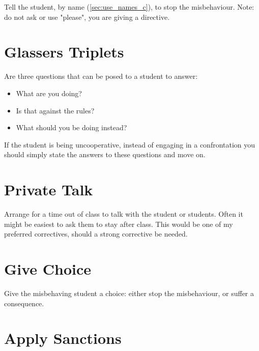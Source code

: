 \documentclass[12pt]{report}
\begin{document}
Tell the student, by name (\ref{sec:use_names_c}), to stop the misbehaviour. Note: do not ask or use "please", you are giving a directive\footnotemark[\value{footnote}].



\section{Glassers Triplets}

Are three questions that can be posed to a student to answer:
\begin{itemize}
  \item What are you doing?
  \item Is that against the rules?
  \item What should you be doing instead?
\end{itemize}
If the student is being uncooperative, instead of engaging in a confrontation 
you should simply state the answers to these questions and move on\footnotemark[\value{footnote}].



\section{Private Talk}
\label{sec:private_talk_c}

Arrange for a time out of class to talk with the student or students. Often it might be easiest to ask them to stay after class\footnotemark[\value{footnote}]. This would be one of my preferred correctives, should a strong corrective be needed. 



\section{Give Choice}
\label{sec:give_choice_c}

Give the misbehaving student a choice: either stop the misbehaviour, or suffer a consequence. 

\section{Apply Sanctions}
\label{sec:sanctions_c}
\end{document}
